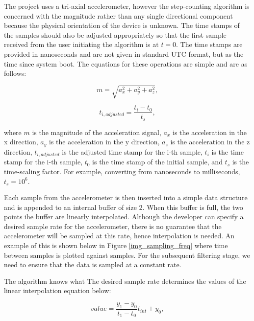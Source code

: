             The project uses a tri-axial accelerometer, however the step-counting algorithm is concerned with the magnitude rather than any single directional component because the physical orientation of the device is unknown. The time stamps of the samples should also be adjusted appropriately so that the first sample received from the user initiating the algorithm is at $t = 0$. The time stamps are provided in nanoseconds and are not given in standard UTC format, but as the time since system boot. The equations for these operations are simple and are as follows:

            \begin{equation}
                m = \sqrt{a_{x}^2 + a_{y}^2 + a_{z}^2},
            \end{equation}

            \begin{equation}
                t_{i,adjusted} = \frac{t_i - t_0}{t_s},
            \end{equation}

            where $m$ is the magnitude of the acceleration signal, $a_{x}$ is the acceleration in the x direction, $a_{y}$ is the acceleration in the y direction, $a_{z}$ is the acceleration in the z direction, $t_{i,adjusted}$ is the adjusted time stamp for the i-th sample, $t_i$ is the time stamp for the i-th sample, $t_0$ is the time stamp of the initial sample, and $t_s$ is the time-scaling factor. For example, converting from nanoseconds to milliseconds, $t_s = 10^6$. 

            Each sample from the accelerometer is then inserted into a simple data structure and is appended to an internal buffer of size 2. When this buffer is full, the two points ihe buffer are linearly interpolated. Although the developer can specify a desired sample rate for the accelerometer, there is no guarantee that the accelerometer will be sampled at this rate, hence interpolation is needed. An example of this is shown below in Figure \ref{img_sampling_freq} where time between samples is plotted against samples. For the subsequent filtering stage, we need to ensure that the data is sampled at a constant rate.

            The algorithm knows what The desired sample rate determines the values of the linear interpolation equation below:

            \begin{equation}
                value = \frac{y_1 - y_0}{t_1 - t_0} t_{int} + y_0,
            \end{equation}

